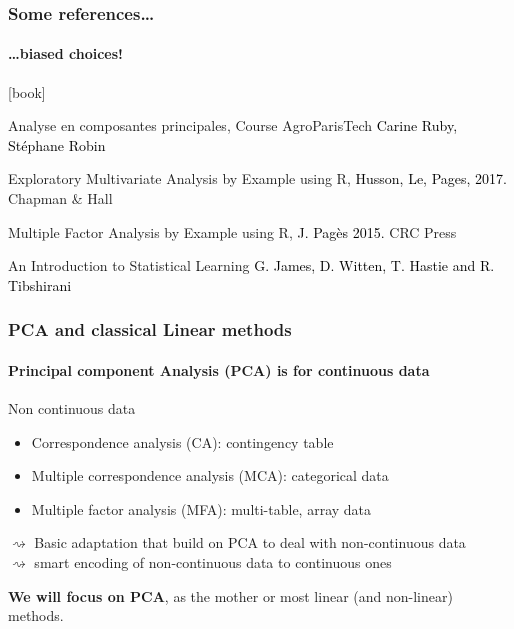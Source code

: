 \begin{frame}
  \frametitle{Some references\dots}
  \framesubtitle{\dots biased choices!}
  
    \begin{thebibliography}{99}
      [book]

     Analyse en composantes principales, \alert{Course AgroParisTech}
    \newblock \textcolor{black}{Carine Ruby, Stéphane Robin}

     Exploratory Multivariate Analysis by Example using R,
    \newblock \textcolor{black}{Husson, Le, Pages, 2017.}
    \newblock Chapman \& Hall

     Multiple Factor Analysis by Example using R,
    \newblock \textcolor{black}{J. Pagès 2015.}
    \newblock CRC Press

     An Introduction to Statistical Learning
    \newblock \textcolor{black}{G. James, D. Witten, T. Hastie and R. Tibshirani}

    \end{thebibliography}

\end{frame}

\begin{frame}
  \frametitle{PCA and classical Linear methods}
  
  \paragraph{\bf Principal component Analysis (PCA) is for continuous data}

  \begin{block}{Non continuous data}
  \begin{itemize}
    \item Correspondence analysis (CA): contingency table \medskip
    \item Multiple correspondence analysis (MCA): categorical data \medskip
    \item Multiple factor analysis (MFA): multi-table, array data 
  \end{itemize}
  $\rightsquigarrow$ Basic \alert{adaptation that build on PCA} to deal with non-continuous data\\
  $\rightsquigarrow$ smart encoding of non-continuous data to continuous ones
  \end{block}

  \vfill
  
  \begin{center}
    \alert{\bf We will focus on PCA}, as the mother or most linear (and non-linear) methods.
  \end{center}
  
\end{frame}

